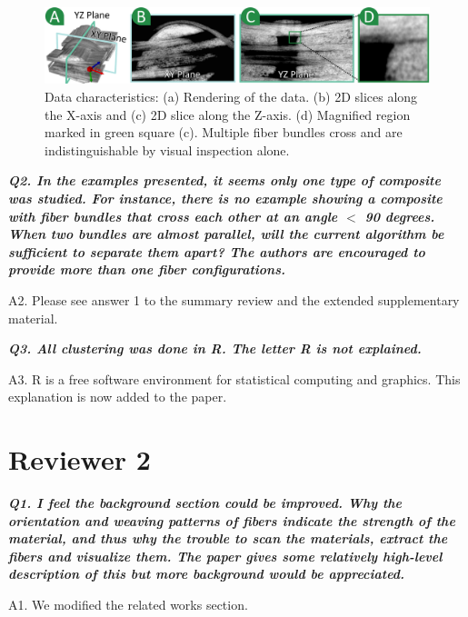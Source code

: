 \documentclass[]{article}
\begin{document}
\begin{figure}[tb]
	\centering
	\includegraphics[width=\linewidth]{images_pvis/data-char.pdf}
	\caption{Data characteristics: (a) Rendering of the data. (b) 2D slices along the X-axis and (c) 2D slice along the Z-axis. (d) Magnified region marked in green square (c). Multiple fiber bundles cross and are indistinguishable by visual inspection alone. }
	\label{fig:data-char-rebuttal}
\end{figure}


\textbf{\textit{
Q2. In the examples presented, it seems only one type of composite was studied. For instance, there is no example showing a composite with fiber bundles that cross each other at an angle $<$ 90 degrees. When two bundles are almost parallel, will the current algorithm be sufficient to separate them apart? The authors are encouraged to provide more than one fiber configurations.
}}


A2. Please see answer 1 to the summary review and the extended supplementary material.  

\makebox[\linewidth]{\rule{0.25\textwidth}{0.4pt}}


\textbf{\textit{
Q3. All clustering was done in R. The letter R is not explained.
}}


A3. R is a free software environment for statistical computing and graphics. This explanation is now added to the paper.

\makebox[\linewidth]{\rule{0.25\textwidth}{0.4pt}}

\section{Reviewer 2}

\textbf{\textit{
Q1. I feel the background section could be improved. Why the orientation and weaving patterns of fibers indicate the strength of the material, and thus why the trouble to scan the materials, extract the fibers and visualize them. The paper gives some relatively high-level description of this but more background would be appreciated.
}}



A1. We modified the related works section.
\end{document}
